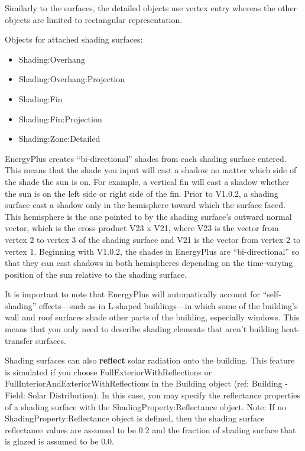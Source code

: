 Similarly to the surfaces, the detailed objects use vertex entry whereas the other objects are limited to rectangular representation.

Objects for attached shading surfaces:

\begin{itemize}
\item
  Shading:Overhang
\item
  Shading:Overhang:Projection
\item
  Shading:Fin
\item
  Shading:Fin:Projection
\item
  Shading:Zone:Detailed
\end{itemize}

EnergyPlus creates ``bi-directional'' shades from each shading surface entered. This means that the shade you input will cast a shadow no matter which side of the shade the sun is on. For example, a vertical fin will cast a shadow whether the sun is on the left side or right side of the fin. Prior to V1.0.2, a shading surface cast a shadow only in the hemisphere toward which the surface faced. This hemisphere is the one pointed to by the shading surface's outward normal vector, which is the cross product V23 x V21, where V23 is the vector from vertex 2 to vertex 3 of the shading surface and V21 is the vector from vertex 2 to vertex 1. Beginning with V1.0.2, the shades in EnergyPlus are ``bi-directional'' so that they can cast shadows in both hemispheres depending on the time-varying position of the sun relative to the shading surface.

It is important to note that EnergyPlus will automatically account for ``self-shading'' effects---such as in L-shaped buildings---in which some of the building's wall and roof surfaces shade other parts of the building, especially windows. This means that you only need to describe shading elements that aren't building heat-transfer surfaces.

Shading surfaces can also \textbf{reflect} solar radiation onto the building. This feature is simulated if you choose FullExteriorWithReflections or FullInteriorAndExteriorWithReflections in the Building object (ref: Building - Field: Solar Distribution). In this case, you may specify the reflectance properties of a shading surface with the ShadingProperty:Reflectance object. Note: If no ShadingProperty:Reflectance object is defined, then the shading surface reflectance values are assumed to be 0.2 and the fraction of shading surface that is glazed is assumed to be 0.0.

